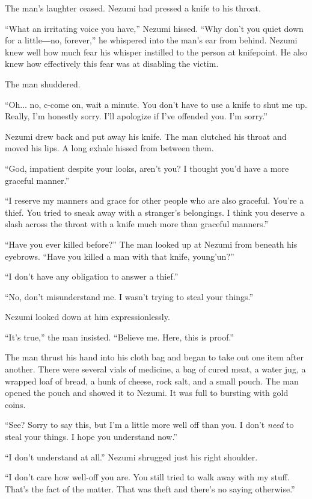 The man's laughter ceased. Nezumi had pressed a knife to his throat.

``What an irritating voice you have,'' Nezumi hissed. ``Why don't you
quiet down for a little―no, forever,'' he whispered into the man's ear
from behind. Nezumi knew well how much fear his whisper instilled to the
person at knifepoint. He also knew how effectively this fear was at
disabling the victim.

The man shuddered.

``Oh... no, c-come on, wait a minute. You don't have to use a knife to
shut me up. Really, I'm honestly sorry. I'll apologize if I've offended
you. I'm sorry.''

Nezumi drew back and put away his knife. The man clutched his throat and
moved his lips. A long exhale hissed from between them.

``God, impatient despite your looks, aren't you? I thought you'd have a
more graceful manner.''

``I reserve my manners and grace for other people who are also graceful.
You're a thief. You tried to sneak away with a stranger's belongings. I
think you deserve a slash across the throat with a knife much more than
graceful manners.''

``Have you ever killed before?'' The man looked up at Nezumi from
beneath his eyebrows. ``Have you killed a man with that knife,
young'un?''

``I don't have any obligation to answer a thief.''

``No, don't misunderstand me. I wasn't trying to steal your things.''

Nezumi looked down at him expressionlessly.

``It's true,'' the man insisted. ``Believe me. Here, this is proof.''

The man thrust his hand into his cloth bag and began to take out one
item after another. There were several vials of medicine, a bag of cured
meat, a water jug, a wrapped loaf of bread, a hunk of cheese, rock salt,
and a small pouch. The man opened the pouch and showed it to Nezumi. It
was full to bursting with gold coins.

``See? Sorry to say this, but I'm a little more well off than you. I
don't \emph{need} to steal your things. I hope you understand now.''

``I don't understand at all.'' Nezumi shrugged just his right shoulder.~

``I don't care how well-off you are. You still tried to walk away with
my stuff. That's the fact of the matter. That was theft and there's no
saying otherwise.''

